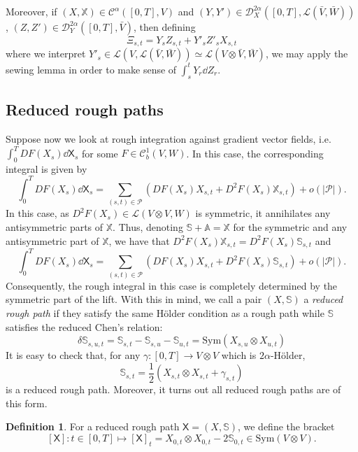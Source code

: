 \documentclass[]{article}
\theoremstyle{definition}
\theoremstyle{definition}
\newtheorem{definition}{Definition}
\begin{document}
Moreover, if \((X, \mathbb{X}) \in \mathcal{C}^\alpha([0, T], V)\) and 
\((Y, Y') \in \mathcal{D}^{2\alpha}_X([0, T], \mathcal{L}(\bar V, \bar W))\),
\((Z, Z') \in \mathcal{D}^{2\alpha}_Y([0, T], \bar V)\), then defining 
\[\Xi_{s, t} = Y_s Z_{s, t} + Y'_s Z'_s X_{s, t}\]
where we interpret \(Y'_s \in \mathcal{L}(V, \mathcal{L}(\bar V, \bar W)) \simeq \mathcal{L}(V \otimes \bar V, \bar W)\), 
we may apply the sewing lemma in order to make sense of 
\(\int_s^t Y_r \dd Z_r\).

\subsection*{Reduced rough paths}

Suppose now we look at rough integration against gradient vector fields, i.e. \(\int_0^T D F(X_s) \dd \mathsf{X}_s\) 
for some \(F \in \mathcal{C}^1_b(V, W)\). In this case, the corresponding integral is given by 
\[\int_0^T D F(X_s) \dd \mathsf{X}_s 
  = \sum_{(s, t) \in \mathcal{P}} \left(DF(X_s) X_{s, t} + D^2F(X_s)\mathbb{X}_{s, t}\right) + o(|\mathcal{P}|).\]
In this case, as \(D^2 F(X_s) \in \mathcal{L}(V \otimes V, W)\) is symmetric, it annihilates any antisymmetric 
parts of \(\mathbb{X}\). Thus, denoting \(\mathbb{S} + \mathbb{A} = \mathbb{X}\) for the symmetric and 
any antisymmetric part of \(\mathbb{X}\), we have that \(D^2F(X_s)\mathbb{X}_{s, t} = D^2F(X_s)\mathbb{S}_{s, t}\) 
and 
\begin{equation}\label{eq:reduced}
  \int_0^T D F(X_s) \dd \mathsf{X}_s 
    = \sum_{(s, t) \in \mathcal{P}} \left(DF(X_s) X_{s, t} + D^2F(X_s)\mathbb{S}_{s, t}\right) + o(|\mathcal{P}|).
\end{equation}
Consequently, the rough integral in this case is completely determined by the symmetric part of the lift. 
With this in mind, we call a pair \((X, \mathbb{S})\) a \textit{reduced rough path} if they satisfy 
the same H\"older condition as a rough path while \(\mathbb{S}\) satisfies the reduced Chen's relation:
\[\delta \mathbb{S}_{s, u, t} = \mathbb{S}_{s, t} - \mathbb{S}_{s, u} - \mathbb{S}_{u, t} = \text{Sym}(X_{s, u} \otimes X_{u, t})\]
It is easy to check that, for any \(\gamma : [0, T] \to V \otimes V\) which is \(2\alpha\)-H\"older, 
\[\mathbb{S}_{s, t} = \frac{1}{2}(X_{s, t} \otimes X_{s, t} + \gamma_{s, t})\]
is a reduced rough path. Moreover, it turns out all reduced rough paths are of this form.
\begin{definition}
  For a reduced rough path \(\mathsf{X} = (X, \mathbb{S})\), we define the bracket 
  \[[\mathsf{X}] : t \in [0, T] \mapsto [\mathsf{X}]_t
    = X_{0, t} \otimes X_{0, t} - 2 \mathbb{S}_{0, t} \in \text{Sym}(V \otimes V) .\]
\end{definition}
\end{document}
